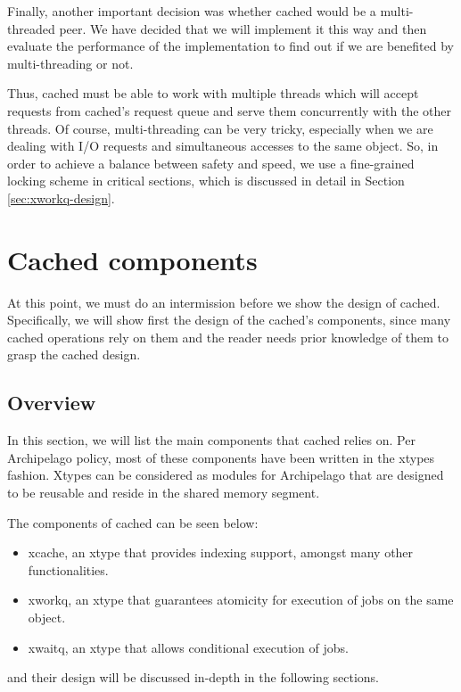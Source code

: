 Finally, another important decision was whether cached would be a 
multi-threaded peer. We have decided that we will implement it this way and 
then evaluate the performance of the implementation to find out if we are 
benefited by multi-threading or not.

Thus, cached must be able to work with multiple threads which will accept 
requests from cached's request queue and serve them concurrently with the other 
threads. Of course, multi-threading can be very tricky, especially when we are 
dealing with I/O requests and simultaneous accesses to the same object.  So, in 
order to achieve a balance between safety and speed, we use a
fine-grained locking scheme in critical sections, which is discussed in detail 
in Section \ref{sec:xworkq-design}.

\section{Cached components}\label{sec:comp-design}

At this point, we must do an intermission before we show the design of cached.  
Specifically, we will show first the design of the cached's components, since 
many cached operations rely on them and the reader needs prior knowledge of 
them to grasp the cached design.

\subsection{Overview}

In this section, we will list the main components that cached relies on. Per 
Archipelago policy, most of these components have been written in the xtypes 
fashion. Xtypes can be considered as modules for Archipelago that are designed 
to be reusable and reside in the shared memory segment.

The components of cached can be seen below:
 
\begin{itemize}
	\item xcache, an xtype that provides indexing support, amongst many other 
		functionalities.
	\item xworkq, an xtype that guarantees atomicity for execution of jobs on 
		the same object.
	\item xwaitq, an xtype that allows conditional execution of jobs.
\end{itemize}

and their design will be discussed in-depth in the following sections.

